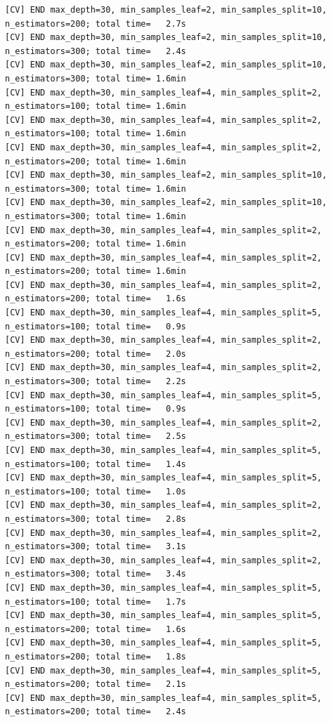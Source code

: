 \documentclass[
  11pt,
  letterpaper,
  DIV=11,
  numbers=noendperiod]{scrartcl}
\begin{document}
\begin{verbatim}
[CV] END max_depth=30, min_samples_leaf=2, min_samples_split=10, n_estimators=200; total time=   2.7s
[CV] END max_depth=30, min_samples_leaf=2, min_samples_split=10, n_estimators=300; total time=   2.4s
[CV] END max_depth=30, min_samples_leaf=2, min_samples_split=10, n_estimators=300; total time= 1.6min
[CV] END max_depth=30, min_samples_leaf=4, min_samples_split=2, n_estimators=100; total time= 1.6min
[CV] END max_depth=30, min_samples_leaf=4, min_samples_split=2, n_estimators=100; total time= 1.6min
[CV] END max_depth=30, min_samples_leaf=4, min_samples_split=2, n_estimators=200; total time= 1.6min
[CV] END max_depth=30, min_samples_leaf=2, min_samples_split=10, n_estimators=300; total time= 1.6min
[CV] END max_depth=30, min_samples_leaf=2, min_samples_split=10, n_estimators=300; total time= 1.6min
[CV] END max_depth=30, min_samples_leaf=4, min_samples_split=2, n_estimators=200; total time= 1.6min
[CV] END max_depth=30, min_samples_leaf=4, min_samples_split=2, n_estimators=200; total time= 1.6min
[CV] END max_depth=30, min_samples_leaf=4, min_samples_split=2, n_estimators=200; total time=   1.6s
[CV] END max_depth=30, min_samples_leaf=4, min_samples_split=5, n_estimators=100; total time=   0.9s
[CV] END max_depth=30, min_samples_leaf=4, min_samples_split=2, n_estimators=200; total time=   2.0s
[CV] END max_depth=30, min_samples_leaf=4, min_samples_split=2, n_estimators=300; total time=   2.2s
[CV] END max_depth=30, min_samples_leaf=4, min_samples_split=5, n_estimators=100; total time=   0.9s
[CV] END max_depth=30, min_samples_leaf=4, min_samples_split=2, n_estimators=300; total time=   2.5s
[CV] END max_depth=30, min_samples_leaf=4, min_samples_split=5, n_estimators=100; total time=   1.4s
[CV] END max_depth=30, min_samples_leaf=4, min_samples_split=5, n_estimators=100; total time=   1.0s
[CV] END max_depth=30, min_samples_leaf=4, min_samples_split=2, n_estimators=300; total time=   2.8s
[CV] END max_depth=30, min_samples_leaf=4, min_samples_split=2, n_estimators=300; total time=   3.1s
[CV] END max_depth=30, min_samples_leaf=4, min_samples_split=2, n_estimators=300; total time=   3.4s
[CV] END max_depth=30, min_samples_leaf=4, min_samples_split=5, n_estimators=100; total time=   1.7s
[CV] END max_depth=30, min_samples_leaf=4, min_samples_split=5, n_estimators=200; total time=   1.6s
[CV] END max_depth=30, min_samples_leaf=4, min_samples_split=5, n_estimators=200; total time=   1.8s
[CV] END max_depth=30, min_samples_leaf=4, min_samples_split=5, n_estimators=200; total time=   2.1s
[CV] END max_depth=30, min_samples_leaf=4, min_samples_split=5, n_estimators=200; total time=   2.4s

\end{verbatim}
\end{document}

